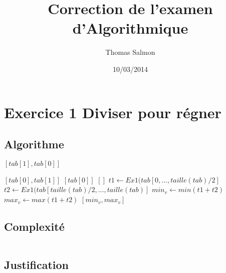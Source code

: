 \documentclass[a4paper]{article}
\title{Correction de l'examen d'Algorithmique}
\author{Thomas Salmon}
\date{10/03/2014}
\begin{document}
\maketitle
\section{Exercice 1 Diviser pour régner}
\subsection{Algorithme}
\begin{algorithmic}
	
		\State \Return $[tab[1], tab[0]]$
	\Else
	
		\State \Return $[tab[0], tab[1]]$
	\EndIf
{}
	\State \Return $[tab[0]]$
	\State \Return $[]$
\Else
\State $t1\gets Ex1(tab[0, \dots, taille(tab)/2]$
\State $t2\gets Ex1(tab[taille(tab)/2, \dots, taille(tab)]$
\State $min_v \gets  min(t1+t2)$
\State	$max_v \gets max(t1+t2)$
\State \Return $[min_v, max_v]$
\EndIf
\EndFunction
\end{algorithmic}
\subsection{Complexité}
\begin{math}
	
\end{math}
\subsection{Justification}
\end{document}
